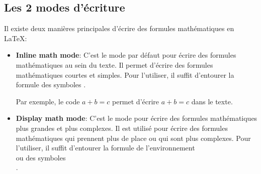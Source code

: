 \subsection{Les 2 modes d'écriture}\label{subsec:latex_math_modes}

Il existe deux manières principales d'écrire des formules mathématiques en LaTeX:\@

\begin{itemize}
    \item \textbf{Inline math mode}: C'est le mode par défaut pour écrire des formules mathématiques au
    sein du texte. Il permet d'écrire des formules mathématiques courtes et simples. 
    Pour l'utiliser, il suffit d'entourer la formule des symboles \texttt{\( \)}.
    
    Par exemple, le code \texttt{\(a + b = c\)} 
    permet d'écrire \(a + b = c\) dans le texte.

    \item \textbf{Display math mode}: C'est le mode pour écrire des formules mathématiques plus grandes et plus complexes.
    Il est utilisé pour écrire des formules mathématiques qui prennent plus de place
    ou qui sont plus complexes. 
    Pour l'utiliser, il suffit d'entourer la formule de l'environnement \texttt{\begin{equation} \end{equation}}
    ou des symboles \texttt{\[ \]}.


\end{itemize}

